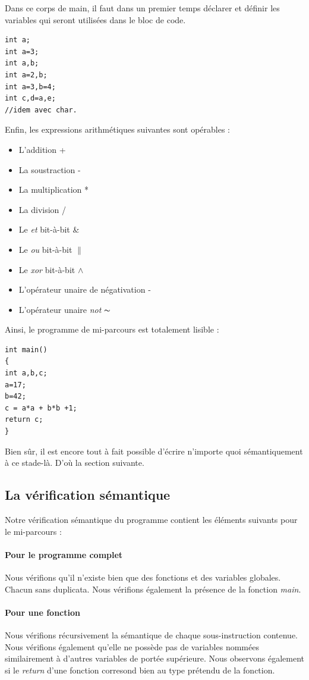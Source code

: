 \documentclass{report}
\begin{document}
Dans ce corps de main, il faut dans un premier temps déclarer et définir les variables qui seront utilisées dans le bloc de code.

\begin{lstlisting}
int a;
int a=3;
int a,b;
int a=2,b;
int a=3,b=4;
int c,d=a,e;
//idem avec char.
\end{lstlisting}

Enfin, les expressions arithmétiques suivantes sont opérables :
\begin{itemize}
\item L'addition +
\item La soustraction -
\item La multiplication *
\item La division /
\item Le \emph{et} bit-à-bit \&
\item Le \emph{ou} bit-à-bit $\|$
\item Le \emph{xor} bit-à-bit $\wedge$
\item L'opérateur unaire de négativation -
\item L'opérateur unaire \emph{not} $\thicksim$
\end{itemize}

Ainsi, le programme de mi-parcours est totalement lisible :
\begin{lstlisting}
int main()
{
int a,b,c;
a=17;
b=42;
c = a*a + b*b +1;
return c;
}
\end{lstlisting}

Bien sûr, il est encore tout à fait possible d'écrire n'importe quoi sémantiquement à ce stade-là. D'où la section suivante.

\subsection{La vérification sémantique}
\label{subsec:Seman}

Notre vérification sémantique du programme contient les éléments suivants pour le mi-parcours :

\paragraph{Pour le programme complet} Nous vérifions qu'il n'existe bien que des fonctions et des variables globales. Chacun sans duplicata. Nous vérifions également la présence de la fonction \emph{main}.\\

\paragraph{Pour une fonction} Nous vérifions récursivement la sémantique de chaque sous-instruction contenue. Nous vérifions également qu'elle ne possède pas de variables nommées similairement à d'autres variables de portée supérieure. Nous observons également si le \emph{return} d'une fonction corresond bien au type prétendu de la fonction.\\
\end{document}
